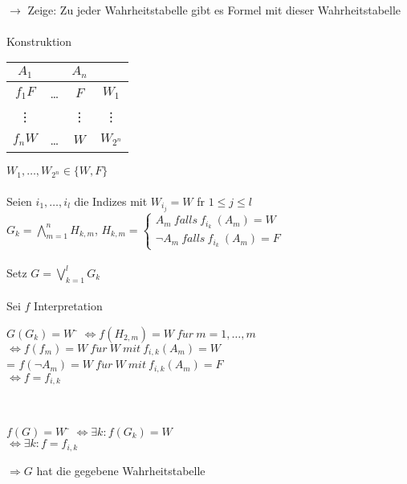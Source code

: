 \noindent\\
$\rightarrow$ Zeige: Zu jeder Wahrheitstabelle gibt es Formel mit dieser Wahrheitstabelle\\
    
\noindent\\
Konstruktion\\

\begin{tabular}{c|c|c|c}
$A_1$ &  & $A_n$ &  \\
\hline
$f_1 F$ & … & $F$ & $W_1$\\
\vdots   &  & \vdots & \vdots \\
$f_n W$ & … & $W$ & $W_{2^n}$ \\
\end{tabular}
\hspace{1cm}$W_1, …, W_{2^n} \in \{W, F\}$\\
    
\noindent\\
Seien $i_1, …, i_l$ die Indizes mit $W_{i_j} = W$ fr $1 \leq j \leq l$\\
$G_k = \bigwedge_{m=1}^n H_{k,m}$, $H_{k,m} = \begin{cases} A_m\ falls\ f_{i_k}\ (A_m)=W \\ \neg A_m\ falls\ f_{i_k}\ (A_m)=F \end{cases}$\\
    
\noindent\\
Setz $G = \bigvee_{k=1}^l G_k$\\
    
\noindent\\
Sei $f$ Interpretation\\
\begin{tabbing}
$G(G_k) = W$ \= $\Leftrightarrow f(H_{2,m}) = W\ f\ddot{u}r\ m=1, …, m$\\
\> $\Leftrightarrow f(f_m) = W\ f\ddot{u}r\ W\ mit\ f_{i,k}(A_m) = W$\\
\> = $f(\neg A_m) = W\ f\ddot{u}r\ W\ mit\ f_{i,k}(A_m) = F$\\
\> $\Leftrightarrow f = f_{i,k}$\\
\end{tabbing}

\noindent\\
\begin{tabbing}
$f(G) = W$ \= $\Leftrightarrow \exists k : f(G_k) = W$\\
\> $\Leftrightarrow \exists k: f= f_{i,k}$\\
\end{tabbing}
$\Rightarrow G$ hat die gegebene Wahrheitstabelle\\

